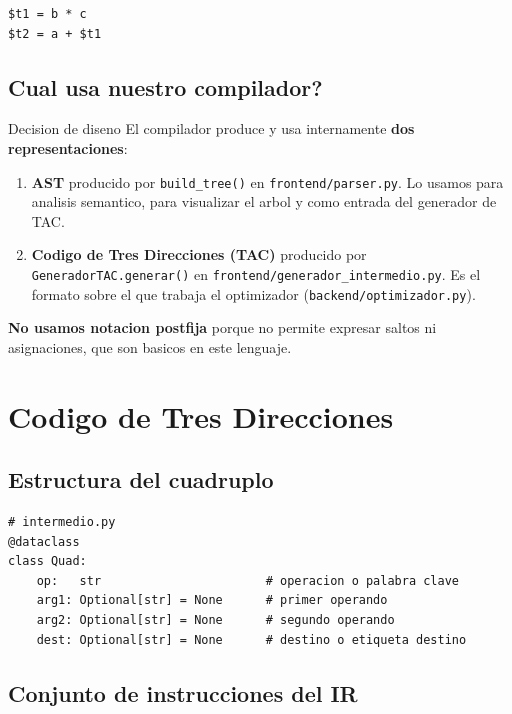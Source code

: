 \documentclass[11pt,a4paper]{article}
\begin{document}
\begin{lstlisting}[style=tac]
$t1 = b * c
$t2 = a + $t1
\end{lstlisting}

\subsection{Cual usa nuestro compilador?}

\begin{caja}{Decision de diseno}
El compilador produce y usa internamente \textbf{dos representaciones}:
\begin{enumerate}[leftmargin=*,nosep]
  \item \textbf{AST} producido por \texttt{build\_tree()} en
        \texttt{frontend/parser.py}. Lo usamos para analisis semantico,
        para visualizar el arbol y como entrada del generador de TAC.
  \item \textbf{Codigo de Tres Direcciones (TAC)} producido por
        \texttt{GeneradorTAC.generar()} en
        \texttt{frontend/generador\_intermedio.py}. Es el formato sobre
        el que trabaja el optimizador (\texttt{backend/optimizador.py}).
\end{enumerate}
\textbf{No usamos notacion postfija} porque no permite expresar saltos
ni asignaciones, que son basicos en este lenguaje.
\end{caja}

\section{Codigo de Tres Direcciones}

\subsection{Estructura del cuadruplo}

\begin{lstlisting}[style=py]
# intermedio.py
@dataclass
class Quad:
    op:   str                       # operacion o palabra clave
    arg1: Optional[str] = None      # primer operando
    arg2: Optional[str] = None      # segundo operando
    dest: Optional[str] = None      # destino o etiqueta destino
\end{lstlisting}

\subsection{Conjunto de instrucciones del IR}
\end{document}
